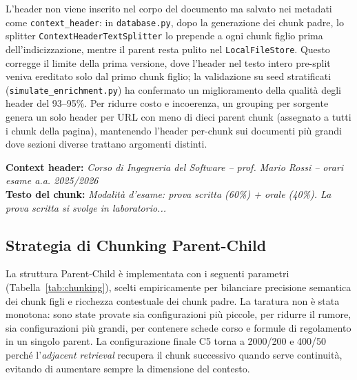 \documentclass[11pt,a4paper]{article}
\newcommand{\code}[1]{\texttt{\small#1}}
\begin{document}
L'header non viene inserito nel corpo del documento ma salvato nei metadati come
\code{context\_header}: in \code{database.py}, dopo la generazione dei chunk padre, lo
splitter \code{ContextHeaderTextSplitter} lo prepende a ogni chunk figlio prima
dell'indicizzazione, mentre il parent resta pulito nel \code{LocalFileStore}. Questo
corregge il limite della prima versione, dove l'header nel testo intero pre-split veniva
ereditato solo dal primo chunk figlio; la validazione su seed stratificati
(\code{simulate\_enrichment.py}) ha confermato un miglioramento della qualità degli header
del 93--95\%. Per ridurre costo e incoerenza, un grouping per sorgente genera un solo
header per URL con meno di dieci parent chunk (assegnato a tutti i chunk della pagina),
mantenendo l'header per-chunk sui documenti più grandi dove sezioni diverse trattano
argomenti distinti.

\begin{tcolorbox}[boxstyle,title={Esempio di context header applicato a un chunk figlio}]
\textbf{Context header:} \textit{Corso di Ingegneria del Software -- prof. Mario Rossi -- orari esame a.a. 2025/2026}\\[4pt]
\textbf{Testo del chunk:} \textit{Modalità d'esame: prova scritta (60\%) + orale (40\%). La prova scritta si svolge in laboratorio...}
\end{tcolorbox}

\subsection{Strategia di Chunking Parent-Child}
\label{sec:chunking}

La struttura Parent-Child è implementata con i seguenti parametri (Tabella~\ref{tab:chunking}),
scelti empiricamente per bilanciare precisione semantica dei chunk figli e ricchezza
contestuale dei chunk padre. La taratura non è stata monotona: sono state provate sia
configurazioni più piccole, per ridurre il rumore, sia configurazioni più grandi, per
contenere schede corso e formule di regolamento in un singolo parent. La configurazione
finale C5 torna a 2000/200 e 400/50 perché l'\emph{adjacent retrieval} recupera il chunk
successivo quando serve continuità, evitando di aumentare sempre la dimensione del
contesto.
\end{document}

